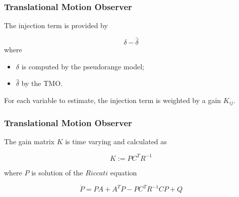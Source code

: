 \documentclass{beamer}
\begin{document}
	\begin{frame}
		\frametitle{Translational Motion Observer}
		The injection term is provided by
		
		\[  \delta - \hat{\delta} \]
		where
		\begin{itemize}
			\item $\delta$ is computed by the pseudorange model;
			\item $\hat{\delta}$ by the TMO.
		\end{itemize}
	
	For each variable to estimate, the injection term is weighted by a gain $K_{ij}$.		
	\end{frame}

	\begin{frame}
		\frametitle{Translational Motion Observer}
		The gain matrix $K$ is time varying and calculated as
		
		\[ K := PC^TR^{-1} \]
		
		where $P$ is solution of the $Riccati$ equation
		
		\[ \dot{P} = PA + A^TP - PC^TR^{-1}CP + Q\]
	\end{frame}

		
		
\end{document}
